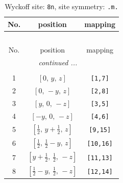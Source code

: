 \documentclass[fleqn,8pt]{jsarticle}
\begin{document}
\begin{longtable}{ccc}
\caption{Wyckoff site: {\tt 8n}, site symmetry: {\tt .m.}}
 \\
 \hline \hline
No. & position & mapping \\ \hline \endfirsthead

\multicolumn{2}{l}{\tablename\ \thetable{}} \\
 \hline \hline
No. & position & mapping \\ \hline \endhead

 \hline \hline
\multicolumn{2}{r}{\footnotesize\it continued ...} \\ \endfoot

 \hline \hline
\multicolumn{2}{r}{} \\ \endlastfoot

1 & $\left[ 0,\, y,\, z \right]$ & {\tt [1,7]} \\ \hline
2 & $\left[ 0,\, - y,\, z \right]$ & {\tt [2,8]} \\ \hline
3 & $\left[ y,\, 0,\, - z \right]$ & {\tt [3,5]} \\ \hline
4 & $\left[ - y,\, 0,\, - z \right]$ & {\tt [4,6]} \\ \hline
5 & $\left[ \frac{1}{2},\, y + \frac{1}{2},\, z \right]$ & {\tt [9,15]} \\ \hline
6 & $\left[ \frac{1}{2},\, \frac{1}{2} - y,\, z \right]$ & {\tt [10,16]} \\ \hline
7 & $\left[ y + \frac{1}{2},\, \frac{1}{2},\, - z \right]$ & {\tt [11,13]} \\ \hline
8 & $\left[ \frac{1}{2} - y,\, \frac{1}{2},\, - z \right]$ & {\tt [12,14]} \\
\end{longtable}
\renewcommand{\arraystretch}{1.2}
\end{document}
